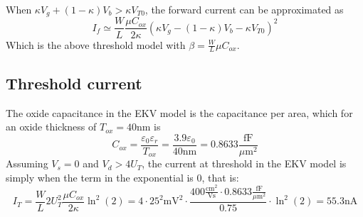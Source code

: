 When \(\kappa V_g + (1-\kappa)V_b > \kappa V_{T0}\), the forward current can be approximated as
\begin{equation*}
    I_f \simeq \frac{W}{L}\frac{\mu C_{ox}}{2\kappa}\left(\kappa V_g - (1-\kappa)V_b - \kappa V_{T0}\right)^2
\end{equation*}
Which is the above threshold model with \(\beta = \frac{W}{L}\mu C_{ox}\).

\subsection{Threshold current}
The oxide capacitance in the EKV model is the capacitance per area, which for an oxide thickness of \(T_{ox}=40\text{nm}\) is
\begin{equation*}
    C_{ox} = \frac{\varepsilon_0 \varepsilon_r }{T_{ox}} = \frac{3.9\varepsilon_0}{40\text{nm}} = 0.8633\frac{\text{fF}}{\mu\text{m}^2}
\end{equation*}
Assuming \(V_s=0\) and \(V_d > 4U_T\), the current at threshold in the EKV model is simply when the term in the exponential is 0, that is:
\begin{equation*}
    I_T = \frac{W}{L}2U_T^2\frac{\mu C_{ox}}{2\kappa}\ln^2\left(2\right) = 4\cdot25^2\text{mV}^2\cdot\frac{400\frac{\text{cm}^2}{\text{Vs}}\cdot0.8633\frac{\text{fF}}{\mu \text{m}^2}}{0.75}\cdot\ln^2\left(2\right) = 55.3 \text{nA}
\end{equation*}

